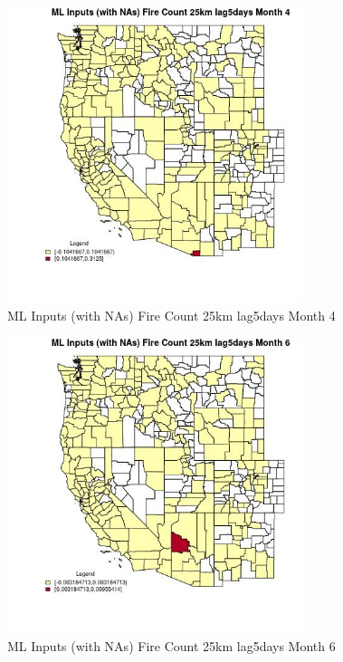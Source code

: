 \begin{figure} 
\centering  
\includegraphics[width=0.77\textwidth]{Code_Outputs/Report_ML_input_PM25_Step4_part_e_de_duplicated_aves_compiled_2019-05-20wNAs_CountyFire_Count_25km_lag5daysmedianMonth4.jpg} 
\caption{\label{fig:Report_ML_input_PM25_Step4_part_e_de_duplicated_aves_compiled_2019-05-20wNAsCountyFire_Count_25km_lag5daysmedianMonth4}ML Inputs (with NAs) Fire Count 25km lag5days Month 4} 
\end{figure} 
 

\begin{figure} 
\centering  
\includegraphics[width=0.77\textwidth]{Code_Outputs/Report_ML_input_PM25_Step4_part_e_de_duplicated_aves_compiled_2019-05-20wNAs_CountyFire_Count_25km_lag5daysmedianMonth6.jpg} 
\caption{\label{fig:Report_ML_input_PM25_Step4_part_e_de_duplicated_aves_compiled_2019-05-20wNAsCountyFire_Count_25km_lag5daysmedianMonth6}ML Inputs (with NAs) Fire Count 25km lag5days Month 6} 
\end{figure} 
 

